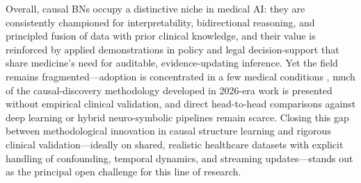 Overall, causal BNs occupy a distinctive niche in medical AI: they are consistently championed for interpretability, bidirectional reasoning, and principled fusion of data with prior clinical knowledge, and their value is reinforced by applied demonstrations in policy and legal decision-support that share medicine's need for auditable, evidence-updating inference. Yet the field remains fragmented---adoption is concentrated in a few medical conditions \cite{mclachlan2020bayesian}, much of the causal-discovery methodology developed in 2026-era work is presented without empirical clinical validation, and direct head-to-head comparisons against deep learning or hybrid neuro-symbolic pipelines \cite{ma2023bayesian} remain scarce. Closing this gap between methodological innovation in causal structure learning and rigorous clinical validation---ideally on shared, realistic healthcare datasets with explicit handling of confounding, temporal dynamics, and streaming updates---stands out as the principal open challenge for this line of research.

